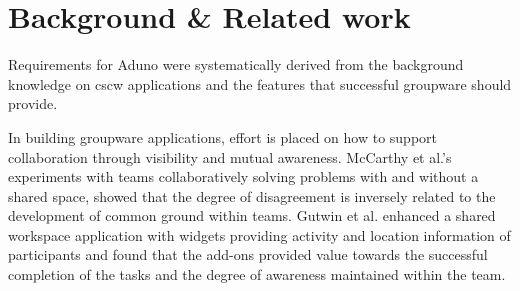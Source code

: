 \documentclass[conference]{IEEEtran}
\begin{document}



\section{Background \& Related work}
\label{sec:background}

Requirements for Aduno were systematically derived from the background knowledge on {\sc cscw} applications and the features that successful groupware should provide. 

In building groupware applications, effort is placed on how to support collaboration through visibility and mutual awareness. McCarthy et al.'s \cite{MCMM91} experiments with teams collaboratively solving problems with and without a shared space, showed that the degree of disagreement is inversely related to the development of common ground within teams. Gutwin et al. \cite{GRG96} enhanced a shared workspace application with widgets providing activity and location information of participants and found that the add-ons provided value towards the successful completion of the tasks and the degree of awareness maintained within the team.
\end{document}
